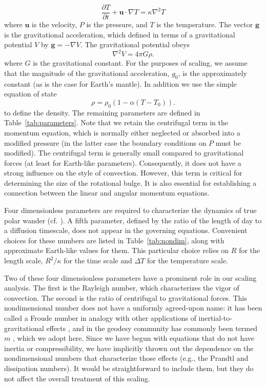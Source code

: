 \documentclass[preprint,12pt,authoryear]{elsarticle}
\begin{document}
\begin{equation}
\frac{\partial T}{\partial t} + \mathbf{u} \cdot \nabla T = \kappa \nabla^2 T
\label{eq:energy}
\end{equation}
where $\mathbf{u}$ is the velocity, $P$ is the pressure, and $T$ is the temperature.
The vector $\mathbf{g}$ is the gravitational acceleration, 
which defined in terms of a gravitational potential $V$ by $\mathbf{g} = -\nabla V$. 
The gravitational potential obeys 
\begin{equation}
\nabla^2 V = 4 \pi G \rho.
\end{equation}
where $G$ is the gravitational constant. 
For the purposes of scaling, we assume that the magnitude of the gravitational acceleration, $g_0$, is the approximately constant (as is the case for Earth's mantle).
In addition we use the simple equation of state
\begin{equation}
\rho = \rho_0 \left( 1 - \alpha (T-T_0) \right).
\label{eq:eos}
\end{equation}
to define the density.
The remaining parameters are defined in Table~\ref{tab:parameters}.
Note that we retain the centrifugal term in the momentum equation, which is normally either neglected or absorbed into a modified pressure
(in the latter case the boundary conditions on $P$ must be modified).
The centrifugal term
is generally small compared to gravitational forces (at least for Earth-like parameters). Consequently, it does  not have a strong influence on the style of convection.
However, this term is critical for determining the size of the rotational bulge. It is also essential for establishing a connection between the linear and angular momentum equations.

Four dimensionless parameters are required to characterize the dynamics of true polar wander  (cf. \citet{barenblatt1996scaling}). A fifth parameter, defined  by the ratio of the length of day to a diffusion timescale, does not appear in the governing equations.
Convenient choices for these numbers are listed in Table~\ref{tab:nondim}, along with approximate Earth-like values for them. This particular choice relies on $R$ for the length scale, $R^2/\kappa$ for the time scale and $\Delta T$ for the temperature scale.

Two of these four dimensionless parameters have a prominent role in our scaling analysis. 
The first is the Rayleigh number, which characterizes the  vigor of convection. 
The second is the ratio of centrifugal to gravitational forces.
This nondimensional number does not have a uniformly agreed-upon name: 
it has been called a Froude number in analogy with other applications of inertial-to-gravitational effects \citep{mckenzie1968influence}, 
and in the geodesy community has commonly been termed $m$ \citep[e.g.][]{nakiboglu1982hydrostatic, chambat2010flattening}, which we adopt here.
Since we have begun with equations that do not have inertia or compressibility, we have implicitly thrown out the dependence on the nondimensional numbers that characterize those effects (e.g., the Prandtl and dissipation numbers).
It would be straightforward to include them, but they do not affect the overall treatment of this scaling.
\end{document}
